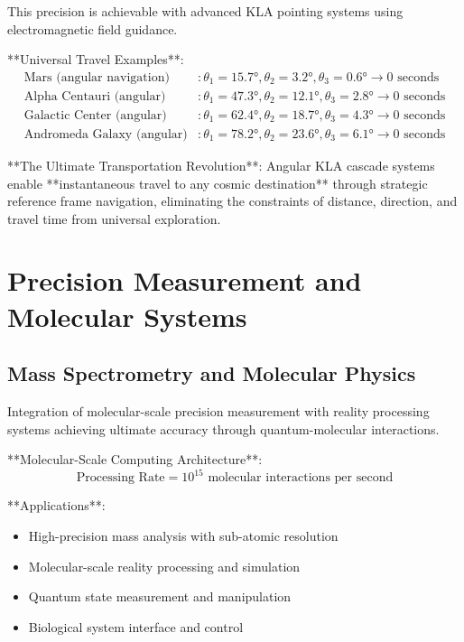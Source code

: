 \documentclass[12pt,a4paper]{article}
\theoremstyle{remark}
\begin{document}
This precision is achievable with advanced KLA pointing systems using electromagnetic field guidance.

**Universal Travel Examples**:
\begin{align}
\text{Mars (angular navigation)} &: \theta_1 = 15.7°, \theta_2 = 3.2°, \theta_3 = 0.6° \rightarrow \text{0 seconds} \\
\text{Alpha Centauri (angular)} &: \theta_1 = 47.3°, \theta_2 = 12.1°, \theta_3 = 2.8° \rightarrow \text{0 seconds} \\
\text{Galactic Center (angular)} &: \theta_1 = 62.4°, \theta_2 = 18.7°, \theta_3 = 4.3° \rightarrow \text{0 seconds} \\
\text{Andromeda Galaxy (angular)} &: \theta_1 = 78.2°, \theta_2 = 23.6°, \theta_3 = 6.1° \rightarrow \text{0 seconds}
\end{align}

**The Ultimate Transportation Revolution**: Angular KLA cascade systems enable **instantaneous travel to any cosmic destination** through strategic reference frame navigation, eliminating the constraints of distance, direction, and travel time from universal exploration.

\section{Precision Measurement and Molecular Systems}

\subsection{Mass Spectrometry and Molecular Physics}

Integration of molecular-scale precision measurement with reality processing systems achieving ultimate accuracy through quantum-molecular interactions.

**Molecular-Scale Computing Architecture**:
\begin{equation}
\text{Processing Rate} = 10^{15} \text{ molecular interactions per second}
\end{equation}

**Applications**:
\begin{itemize}
\item High-precision mass analysis with sub-atomic resolution
\item Molecular-scale reality processing and simulation
\item Quantum state measurement and manipulation
\item Biological system interface and control
\end{itemize}
\end{document}
